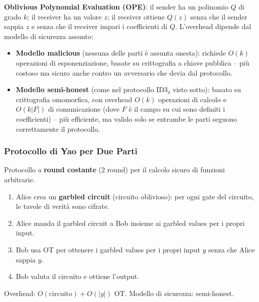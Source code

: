\documentclass[a4paper,11pt]{article}
\begin{document}
\textbf{Oblivious Polynomial Evaluation (OPE)}: il sender ha un polinomio $Q$ di grado $k$; il receiver ha un valore $z$; il receiver ottiene $Q(z)$ senza che il sender sappia $z$ e senza che il receiver impari i coefficienti di $Q$. L'overhead dipende dal modello di sicurezza assunto:
\begin{itemize}
  \item \textbf{Modello malicious} (nessuna delle parti \`{e} assunta onesta): richiede $O(k)$ operazioni di esponenziazione, basate su crittografia a chiave pubblica -- pi\`{u} costoso ma sicuro anche contro un avversario che devia dal protocollo.
  \item \textbf{Modello semi-honest} (come nel protocollo ID3$_\delta$ visto sotto): basato su crittografia omomorfica, con overhead $O(k)$ operazioni di calcolo e $O(k|F|)$ di comunicazione (dove $F$ \`{e} il campo su cui sono definiti i coefficienti) -- pi\`{u} efficiente, ma valido solo se entrambe le parti seguono correttamente il protocollo.
\end{itemize}

\subsubsection{Protocollo di Yao per Due Parti}

\begin{teorema}
Protocollo a \textbf{round costante} (2 round) per il calcolo sicuro di funzioni arbitrarie.
\begin{enumerate}
  \item Alice crea un \textbf{garbled circuit} (circuito oblivioso): per ogni gate del circuito, le tavole di verit\`{a} sono cifrate.
  \item Alice manda il garbled circuit a Bob insieme ai garbled values per i propri input.
  \item Bob usa OT per ottenere i garbled values per i propri input $y$ senza che Alice sappia $y$.
  \item Bob valuta il circuito e ottiene l'output.
\end{enumerate}
Overhead: $O(\text{circuito}) + O(|y|)$ OT. Modello di sicurezza: semi-honest.
\end{teorema}
\end{document}
